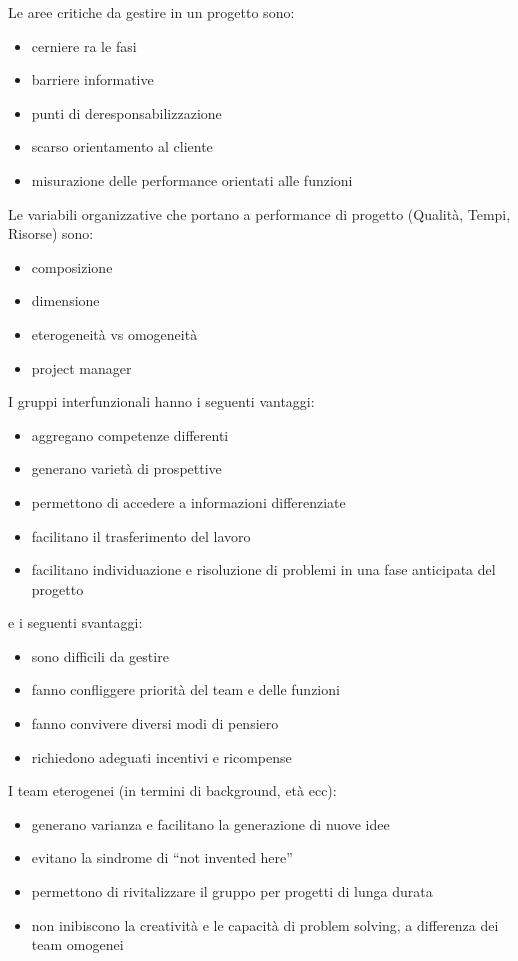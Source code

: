 \documentclass[answers, a4paper, 11pt]{exam}
\begin{document}
Le aree critiche da gestire in un progetto sono:
\begin{itemize}
    \item cerniere ra le fasi
    \item barriere informative
    \item punti di deresponsabilizzazione
    \item scarso orientamento al cliente
    \item misurazione delle performance orientati alle funzioni
\end{itemize}

Le variabili organizzative che portano a performance di progetto (Qualità, Tempi, Risorse) sono:

\begin{itemize}
    \item composizione
    \item dimensione
    \item eterogeneità vs omogeneità
    \item project manager
\end{itemize}

I gruppi interfunzionali hanno i seguenti vantaggi:

\begin{itemize}
    \item aggregano competenze differenti
    \item generano varietà di prospettive
    \item permettono di accedere a informazioni differenziate
    \item facilitano il trasferimento del lavoro
    \item facilitano individuazione e risoluzione di problemi in una fase anticipata del progetto
\end{itemize}

e i seguenti svantaggi:

\begin{itemize}
    \item sono difficili da gestire
    \item fanno confliggere priorità del team e delle funzioni
    \item fanno convivere diversi modi di pensiero
    \item richiedono adeguati incentivi e ricompense
\end{itemize}

I team eterogenei (in termini di background, età ecc):

\begin{itemize}
    \item generano varianza e facilitano la generazione di nuove idee
    \item evitano la sindrome di ``not invented here''
    \item permettono di rivitalizzare il gruppo per progetti di lunga durata
    \item non inibiscono la creatività e le capacità di problem solving, a differenza dei team omogenei
\end{itemize}
\end{document}
